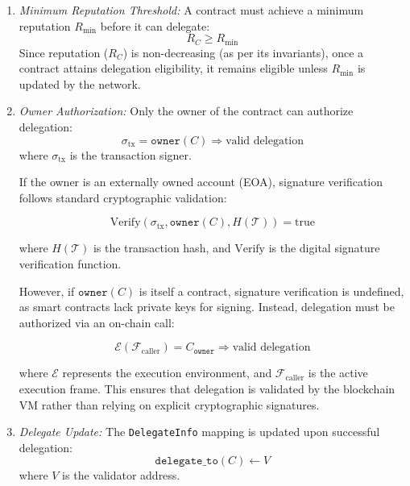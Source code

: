 \documentclass{article}
\begin{document}
\begin{enumerate}
    \item \textit{Minimum Reputation Threshold:} A contract must achieve a minimum reputation \( R_{\text{min}} \) before it can delegate:
    \begin{equation}
        R_C \geq R_{\text{min}}
    \end{equation}
    Since reputation (\( R_C \)) is non-decreasing (as per its invariants), once a contract attains delegation eligibility, it remains eligible unless \( R_{\text{min}} \) is updated by the network.

    \item \textit{Owner Authorization:} Only the owner of the contract can authorize delegation:
    \begin{equation}
        \sigma_{\text{tx}} = \texttt{owner}(C) \Rightarrow \text{valid delegation}
    \end{equation}
    where \( \sigma_{\text{tx}} \) is the transaction signer.

    If the owner is an externally owned account (EOA), signature verification follows standard cryptographic validation:

    \begin{equation}
        \text{Verify}(\sigma_{\text{tx}}, \texttt{owner}(C), H(\mathcal{T})) = \text{true}
    \end{equation}

    where \( H(\mathcal{T}) \) is the transaction hash, and \( \text{Verify} \) is the digital signature verification function.

    However, if \( \texttt{owner}(C) \) is itself a contract, signature verification is undefined, as smart contracts lack private keys for signing. Instead, delegation must be authorized via an on-chain call:

    \begin{equation}
        \mathcal{E}(\mathcal{F}_{\text{caller}}) = C_{\texttt{owner}} \Rightarrow \text{valid delegation}
    \end{equation}

    where \( \mathcal{E} \) represents the execution environment, and \( \mathcal{F}_{\text{caller}} \) is the active execution frame. This ensures that delegation is validated by the blockchain VM rather than relying on explicit cryptographic signatures.

    \item \textit{Delegate Update:} The \texttt{DelegateInfo} mapping is updated upon successful delegation:
    \begin{equation}
        \texttt{delegate\_to}(C) \gets V
    \end{equation}
    where \( V \) is the validator address.


\end{enumerate}
\end{document}
